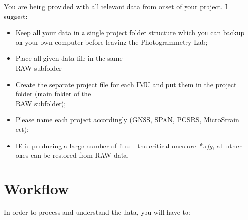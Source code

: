 \documentclass[british]{book}
\begin{document}
You are being provided with all relevant data from onset of your project. I suggest:

\begin{itemize}
	\item Keep all your data in a single project folder structure which you can backup on your own computer before leaving the Photogrammetry Lab;
	\item Place all given data file in the same  \\RAW subfolder
	\item Create the separate project file for each IMU and put them in the project folder (main folder of the \\RAW subfolder);
	\item Please name each project accordingly (GNSS, SPAN, POSRS, MicroStrain ect); 
	\item IE is producing a large number of files - the critical ones are \textit{*.cfg}, all other ones can be restored from RAW data.
\end{itemize}


\section{Workflow}

In order to process and understand the data, you will have to:
\end{document}
